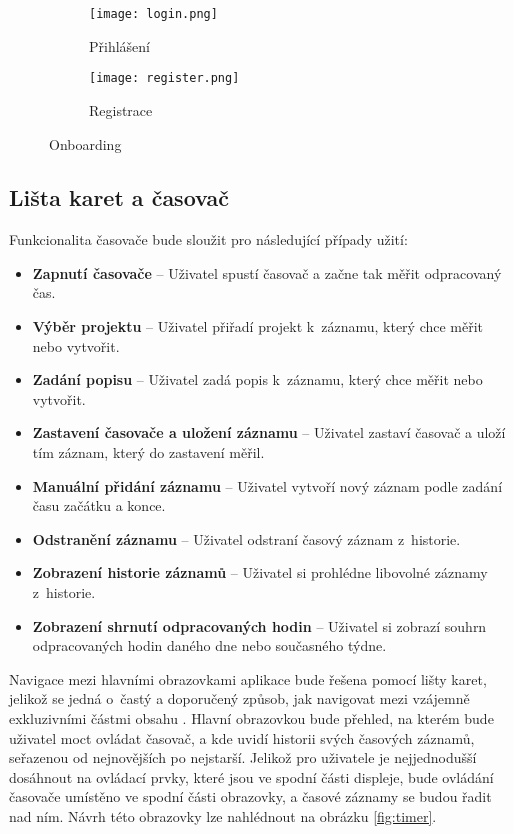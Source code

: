 \begin{figure}[h]
    \centering
    \begin{subfigure}[b]{0.4\textwidth}
		\centering
		\texttt{[image: login.png]}
		\caption{Přihlášení}
		\label{fig:login}
	\end{subfigure}
	\hspace{2cm}
	\begin{subfigure}[b]{0.4\textwidth}
		\centering
		\texttt{[image: register.png]}
		\caption{Registrace}
	\end{subfigure}
	\caption{Onboarding}
	\label{fig:onboarding}
\end{figure}

\subsection{Lišta karet a časovač}\label{feature-timer}

Funkcionalita časovače bude sloužit pro následující případy užití:
\begin{itemize}
\item\textbf{Zapnutí časovače} – Uživatel spustí časovač a začne tak měřit odpracovaný čas.
\item\textbf{Výběr projektu} – Uživatel přiřadí projekt k~záznamu, který chce měřit nebo vytvořit.
\item\textbf{Zadání popisu} – Uživatel zadá popis k~záznamu, který chce měřit nebo vytvořit.
\item\textbf{Zastavení časovače a uložení záznamu} – Uživatel zastaví časovač a uloží tím záznam, který do zastavení měřil.
\item\textbf{Manuální přidání záznamu} – Uživatel vytvoří nový záznam podle zadání času začátku a konce.
\item\textbf{Odstranění záznamu} – Uživatel odstraní časový záznam z~historie. 
\item\textbf{Zobrazení historie záznamů} – Uživatel si prohlédne libovolné záznamy z~historie.
\item\textbf{Zobrazení shrnutí odpracovaných hodin} – Uživatel si zobrazí souhrn odpracovaných hodin daného dne nebo současného týdne.
\end{itemize}

Navigace mezi hlavními obrazovkami aplikace bude řešena pomocí lišty karet, jelikož se jedná o~častý a doporučený způsob, jak navigovat mezi vzájemně exkluzivními částmi obsahu \cite{apple-guidelines-tabbars}. Hlavní obrazovkou bude přehled, na kterém bude uživatel moct ovládat časovač, a kde uvidí historii svých časových záznamů, seřazenou od nejnovějších po nejstarší. Jelikož pro uživatele je nejjednodušší dosáhnout na ovládací prvky, které jsou ve spodní části displeje, bude ovládání časovače umístěno ve spodní části obrazovky, a časové záznamy se budou řadit nad ním. Návrh této obrazovky lze nahlédnout na obrázku \ref{fig:timer}.

